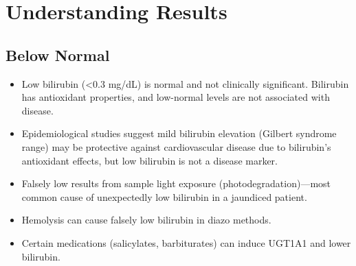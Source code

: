 \section*{Understanding Results}

\subsection*{Below Normal}
\begin{itemize}
  \item Low bilirubin (<0.3 mg/dL) is normal and not clinically significant. Bilirubin has antioxidant properties, and low-normal levels are not associated with disease.
  \item Epidemiological studies suggest mild bilirubin elevation (Gilbert syndrome range) may be protective against cardiovascular disease due to bilirubin's antioxidant effects, but low bilirubin is not a disease marker.
  \item Falsely low results from sample light exposure (photodegradation)---most common cause of unexpectedly low bilirubin in a jaundiced patient.
  \item Hemolysis can cause falsely low bilirubin in diazo methods.
  \item Certain medications (salicylates, barbiturates) can induce UGT1A1 and lower bilirubin.
\end{itemize}

